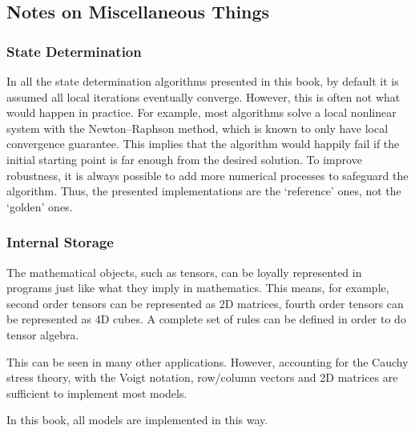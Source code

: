 \subsection{Notes on Miscellaneous Things}
\subsubsection{State Determination}
In all the state determination algorithms presented in this book, by default it is assumed all local iterations eventually converge.
However, this is often not what would happen in practice.
For example, most algorithms solve a local nonlinear system with the Newton--Raphson method, which is known to only have local convergence guarantee.
This implies that the algorithm would happily fail if the initial starting point is far enough from the desired solution.
To improve robustness, it is always possible to add more numerical processes to safeguard the algorithm.
Thus, the presented implementations are the `reference' ones, not the `golden' ones.
\subsubsection{Internal Storage}
The mathematical objects, such as tensors, can be loyally represented in programs just like what they imply in mathematics.
This means, for example, second order tensors can be represented as 2D matrices, fourth order tensors can be represented as 4D cubes.
A complete set of rules can be defined in order to do tensor algebra.

This can be seen in many other applications.
However, accounting for the Cauchy stress theory, with the Voigt notation, row/column vectors and 2D matrices are sufficient to implement most models.

In this book, all models are implemented in this way.